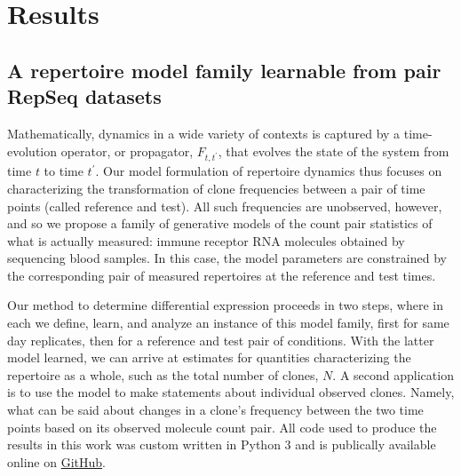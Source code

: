 \documentclass[letterpaper,english,prl,reprint,longbibliography]{revtex4-1} %
\begin{document}
\section*{Results}

\subsection{A repertoire model family learnable from pair RepSeq datasets}\label{sec:model}
Mathematically, dynamics in a wide variety of contexts is captured by a time-evolution operator, or propagator, $F_{t,t^{\prime}}$, that evolves the state of the system from time $t$ to time $t^{\prime}$. Our model formulation of repertoire dynamics thus focuses on characterizing the transformation of clone frequencies between a pair of time points (called reference and test). All such frequencies are unobserved, however, and so we propose a family of generative models of the count pair statistics of what is actually measured: immune receptor RNA molecules obtained by sequencing blood samples. In this case, the model parameters are constrained by the corresponding pair of measured repertoires at the reference and test times. 

Our method to determine differential expression proceeds in two steps, where in each we define, learn, and analyze an instance of this model family, first for same day replicates, then for a reference and test pair of conditions. With the latter model learned, we can arrive at estimates for quantities characterizing the repertoire as a whole, such as the total number of clones, $N$.
A second application is to use the model to make statements about individual observed clones. Namely, what can be said about changes in a clone's frequency between the two time points based on its observed molecule count pair.
All code used to produce the results in this work was custom written in Python 3 and is publically available online on \hyperlink{https://github.com/mptouzel/bayes_diffexpr}{GitHub}.
\end{document}
